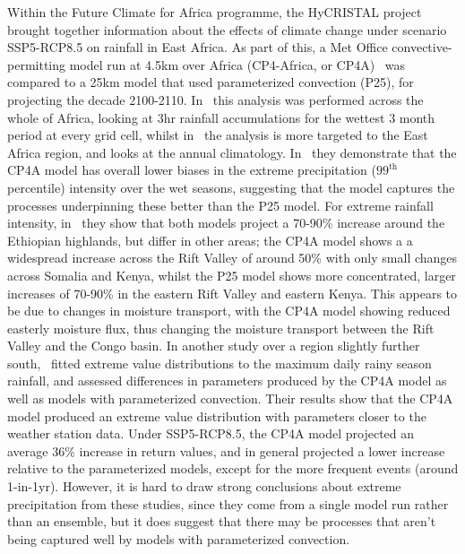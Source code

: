 \documentclass[../main.tex]{subfiles}
\begin{document}
Within the Future Climate for Africa programme, the HyCRISTAL project~\citep{finney_scientific_2019} brought together information about the effects of climate change under scenario SSP5-RCP8.5 on rainfall in East Africa. As part of this, a Met Office convective-permitting model run at 4.5km over Africa (CP4-Africa, or CP4A)~\citep{stratton_pan-african_2018} was compared to a 25km model that used parameterized convection (P25), for projecting the decade 2100-2110. In~\cite{kendon_enhanced_2019} this analysis was performed across the whole of Africa, looking at 3hr rainfall accumulations for the wettest 3 month period at every grid cell, whilst in~\cite{finney_effects_2020} the analysis is more targeted to the East Africa region, and looks at the annual climatology. In~\cite{kendon_enhanced_2019} they demonstrate that the CP4A model has overall lower biases in the extreme precipitation ($99^{\text{th}}$ percentile) intensity over the wet seasons, suggesting that the model captures the processes underpinning these better than the P25 model. For extreme rainfall intensity, in~\cite{finney_effects_2020} they show that both models project a 70-90\% increase around the Ethiopian highlands, but differ in other areas; the CP4A model shows a a widespread increase across the Rift Valley of around 50\% with only small changes across Somalia and Kenya, whilst the P25 model shows more concentrated, larger increases of 70-90\% in the eastern Rift Valley and eastern Kenya. This appears to be due to changes in moisture transport, with the CP4A model showing reduced easterly moisture flux, thus changing the moisture transport between the Rift Valley and the Congo basin. In another study over a region slightly further south,~\cite{chapman_climate_2022} fitted extreme value distributions to the maximum daily rainy season rainfall, and assessed differences in parameters produced by the CP4A model as well as models with parameterized convection. Their results show that the CP4A model produced an extreme value distribution with parameters closer to the weather station data. Under SSP5-RCP8.5, the CP4A model projected an average 36\% increase in return values, and in general projected a lower increase relative to the parameterized models, except for the more frequent events (around 1-in-1yr). However, it is hard to draw strong conclusions about extreme precipitation from these studies, since they come from a single model run rather than an ensemble, but it does suggest that there may be processes that aren't being captured well by models with parameterized convection.
\end{document}
